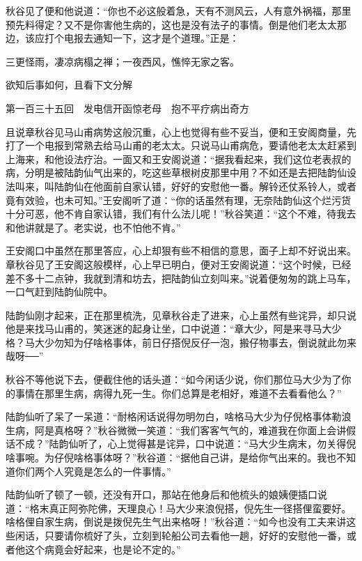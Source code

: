 \documentclass[12pt,UTF8]{ctexbook}
\begin{document}
{{{秋谷见了便和他说道：“你也不必这般着急，天有不测风云，人有意外祸福，那里预先料得定？又不是你害他生病的，这也是没有法子的事情。倒是他们老太太那边，该应打个电报去通知一下，这才是个道理。”正是：

三更怪雨，凄凉病榻之禅；一夜西风，憔悴无家之客。

欲知后事如何，且看下文分解





第一百三十五回　发电信开函惊老母　抱不平疗病出奇方





且说章秋谷见马山甫病势这般沉重，心上也觉得有些不妥当，便和王安阁商量，先打了一个电报到常熟去给马山甫的老太太。只说马山甫病危，要请他老太太赶紧到上海来，和他设法疗治。一面又和王安阁说道：“据我看起来，我们这位老表叔的病，分明是被陆韵仙气出来的，吃这些草根树皮那里中用？不如还是去把陆韵仙设法叫来，叫陆韵仙在他面前自家认错，好好的安慰他一番。解铃还仗系铃人，或者竟有效验，也未可知。”王安阁听了道：“你的话虽然有理，无奈陆韵仙这个烂污货十分可恶，他不肯自家认错，我们有什么法儿呢！”秋谷笑道：“这个不难，待我去和他讲就是了。老实说，也不怕他不肯。”

王安阁口中虽然在那里答应，心上却狠有些不相信的意思，面子上却不好说出来。章秋谷见了王安阁这般模样，心上早已明白，便对王安阁说道：“这个时候，已经差不多十二点钟，我就到清和坊去，把陆韵仙立刻叫来。”说着便匆匆的跳上马车，一口气赶到陆韵仙院中。

陆韵仙刚才起来，正在那里梳洗，见章秋谷走了进来，心上虽然有些诧异，却只说他是来找马山甫的，笑迷迷的起身让坐，口中说道：“章大少，阿是来寻马大少格？马大少勿知为仔啥格事体，前日仔搭倪反仔一泡，搬仔物事去，倒说就此勿来哉呀──”

秋谷不等他说下去，便截住他的话头道：“如今闲话少说，你们那位马大少为了你的事情在那里生病，病得九死一生。你们总算是老相好，难道不去看看他么？”

陆韵仙听了呆了一呆道：“耐格闲话说得勿明勿白，啥格马大少为仔倪格事体勒浪生病，阿是真格呀？”秋谷微微一笑道：“我们客客气气的，难道我在你面上会讲假话不成？”陆韵仙听了，心上觉得甚是诧异，口中说道：“马大少生病末，勿关得倪啥事啘。为仔倪啥格事体呀？”秋谷道：“据他自己讲，是给你气出来的。我也不知道你们两个人究竟是怎么的一件事情。”

陆韵仙听了顿了一顿，还没有开口，那站在他身后和他梳头的娘姨便插口说道：“格末真正阿弥陀佛，天理良心！马大少来浪倪搭，倪先生一径搭俚蛮要好。啥格俚自家生病，倒说是拨倪先生气出来格呀！”秋谷道：“如今也没有工夫来讲这些闲话，只要请你梳好了头，立刻到轮船公司去看他一趟，好好的安慰他一番，或者他这个病竟会好起来，也是论不定的。”

}}}
\end{document}
